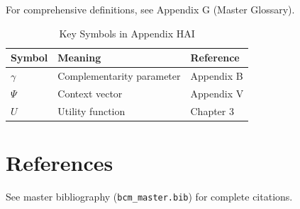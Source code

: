 For comprehensive definitions, see Appendix G (Master Glossary).

\begin{table}[htbp]
\centering
\caption{Key Symbols in Appendix HAI}
\begin{tabular}{lll}
\toprule
\textbf{Symbol} & \textbf{Meaning} & \textbf{Reference} \\
\midrule
$\gamma$ & Complementarity parameter & Appendix B \\
$\Psi$ & Context vector & Appendix V \\
$U$ & Utility function & Chapter 3 \\
\bottomrule
\end{tabular}
\end{table}


\section{References}
\label{sec:hai-references}

See master bibliography (\texttt{bcm\_master.bib}) for complete citations.

\nocite{bcm_master}


